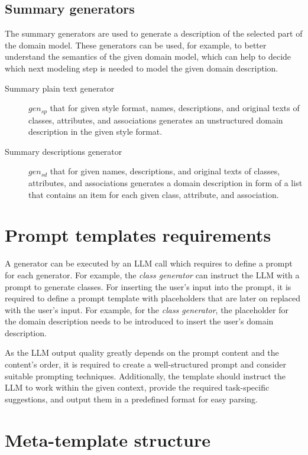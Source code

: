 \subsection{Summary generators}

The summary generators are used to generate a description of the selected part of the domain model. These generators can be used, for example, to better understand the semantics of the given domain model, which can help to decide which next modeling step is needed to model the given domain description.

\begin{description}
\item [Summary plain text generator] $gen_{sp}$ that for given style format, names, descriptions, and original texts of classes, attributes, and associations generates an unstructured domain description in the given style format.

\item [Summary descriptions generator] $gen_{sd}$ that for given names, descriptions, and original texts of classes, attributes, and associations generates a domain description in form of a list that contains an item for each given class, attribute, and association.
\end{description}


\section{Prompt templates requirements}

A generator can be executed by an LLM call which requires to define a prompt for each generator. For example, the \emph{class generator} can instruct the LLM with a prompt to generate classes. For inserting the user's input into the prompt, it is required to define a prompt template with placeholders that are later on replaced with the user's input. For example, for the \emph{class generator}, the placeholder for the domain description needs to be introduced to insert the user's domain description.

As the LLM output quality greatly depends on the prompt content and the content's order, it is required to create a well-structured prompt and consider suitable prompting techniques. Additionally, the template should instruct the LLM to work within the given context, provide the required task-specific suggestions, and output them in a predefined format for easy parsing.


\section{Meta-template structure}

